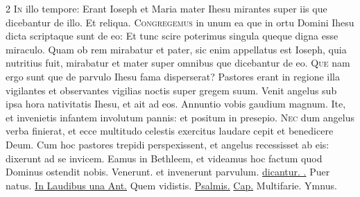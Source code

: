 \begin{multicols*}{2}
\lettrine[lines=2]{\zallmancaps \color{Blue} I}{n} illo tempore: Erant Ioseph et Maria mater Ihesu mirantes super iis que dicebantur de illo. Et reliqua.
\lettrine[lines=2]{\zallmancaps \color{Red} C}{ongregemus} in unum ea que in ortu Domini Ihesu dicta scriptaque sunt de eo: Et tunc scire poterimus singula queque digna esse miraculo. Quam ob rem mirabatur et pater, sic enim appellatus est Ioseph, quia nutritius fuit, mirabatur et mater super omnibus que dicebantur de eo.
\lettrine[lines=2]{\zallmancaps \color{Blue} Q}{ue} nam ergo sunt que de parvulo Ihesu fama disperserat? Pastores erant in regione illa vigilantes et observantes vigilias noctis super gregem suum. Venit angelus sub ipsa hora nativitatis Ihesu, et ait ad eos. Annuntio vobis gaudium magnum. Ite, et invenietis infantem involutum pannis: et positum in presepio.
\lettrine[lines=2]{\zallmancaps \color{Red} N}{ec} dum angelus verba finierat, et ecce multitudo celestis exercitus laudare cepit et benedicere Deum. Cum hoc pastores trepidi perspexissent, et angelus recessisset ab eis: dixerunt ad se invicem. Eamus in Bethleem, et videamus hoc factum quod Dominus ostendit nobis. Venerunt. et invenerunt parvulum.
\newline {} \ul{dicantur. \Vbar .} Puer natus. \ul{In Laudibus una Ant.} Quem vidistis. \ul{Psalmis.}  \ul{Cap.} Multifarie.
{\color{Red} Ymnus.}
\end{multicols*}
